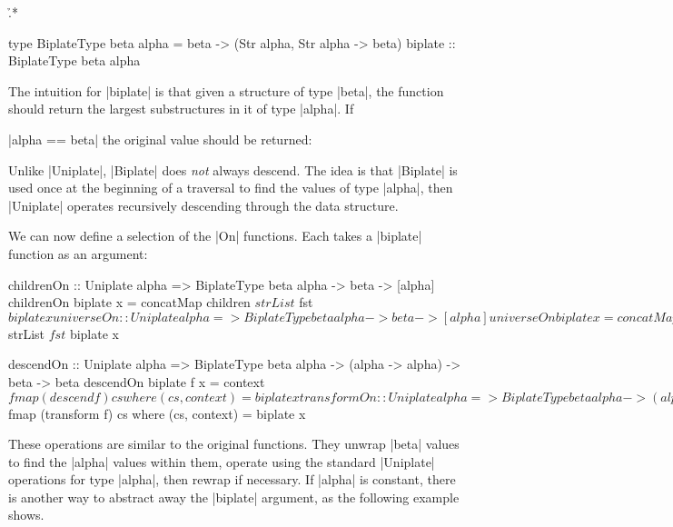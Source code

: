 \h{.*}\begin{code}
type BiplateType beta alpha = beta -> (Str alpha, Str alpha -> beta)
biplate :: BiplateType beta alpha
\end{code}

The intuition for |biplate| is that given a structure of type |beta|, the function should return the largest substructures in it of type |alpha|. If \ignore|alpha == beta| the original value should be returned:


Unlike |Uniplate|, |Biplate| does \textit{not} always descend. The idea is that |Biplate| is used once at the beginning of a traversal to find the values of type |alpha|, then |Uniplate| operates recursively descending through the data structure.

We can now define a selection of the |On| functions. Each takes a |biplate| function as an argument:

\begin{code}
childrenOn :: Uniplate alpha => BiplateType beta alpha -> beta -> [alpha]
childrenOn biplate x = concatMap children $ strList $ fst $ biplate x

universeOn :: Uniplate alpha => BiplateType beta alpha -> beta -> [alpha]
universeOn biplate x = concatMap universe $ strList $ fst $ biplate x

descendOn ::  Uniplate alpha => BiplateType beta alpha -> (alpha -> alpha) -> beta -> beta
descendOn biplate f x = context $ fmap (descend f) cs
    where (cs, context) = biplate x

transformOn :: Uniplate alpha => BiplateType beta alpha -> (alpha -> alpha) -> beta -> beta
transformOn biplate f x = context $ fmap (transform f) cs
    where (cs, context) = biplate x
\end{code}

These operations are similar to the original functions. They unwrap |beta| values to find the |alpha| values within them, operate using the standard |Uniplate| operations for type |alpha|, then rewrap if necessary. If |alpha| is constant, there is another way to abstract away the |biplate| argument, as the following example shows.

